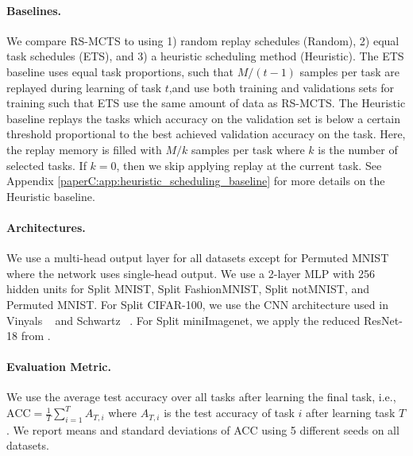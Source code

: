 \paragraph{Baselines.} We compare RS-MCTS to using 1) random replay schedules (Random), 2) equal task schedules (ETS), and 3) a heuristic scheduling method (Heuristic). The ETS baseline uses equal task proportions, such that $M/(t-1)$ samples per task are replayed during learning of task $t$,and use both training and validations sets for training such that ETS use the same amount of data as RS-MCTS. %
The Heuristic baseline replays the tasks which accuracy on the validation set is below a certain threshold proportional to the best achieved validation accuracy on the task. Here, the replay memory is filled with $M/k$ samples per task where $k$ is the number of selected tasks. If $k=0$, then we skip applying replay at the current task.  
See Appendix \ref{paperC:app:heuristic_scheduling_baseline} for more details on the Heuristic baseline. 



\vspace{-3mm}
\paragraph{Architectures.} We use a multi-head output layer for all datasets except for Permuted MNIST where the network uses single-head output. We use a 2-layer MLP with 256 hidden units for Split MNIST, Split FashionMNIST, Split notMNIST, and Permuted MNIST. For Split CIFAR-100, we use the CNN architecture used in Vinyals \etal~ and Schwartz \etal~. For Split miniImagenet, we apply the reduced ResNet-18 from . 

\vspace{-3mm}
\paragraph{Evaluation Metric.} We use the average test accuracy over all tasks after learning the final task, i.e., $\text{ACC} = \frac{1}{T} \sum_{i=1}^{T} A_{T, i}$ where $A_{T, i}$ is the test accuracy of task $i$ after learning task $T$. We report means and standard deviations of ACC using 5 different seeds on all datasets. 



